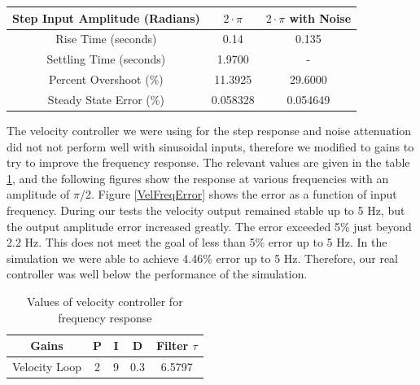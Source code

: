 \documentclass{article}
\theoremstyle{plain}
\theoremstyle{definition}
\theoremstyle{remark}
\begin{document}
\begin{table}[htb]
\begin{center}
    \begin{tabular}{|c|c|c|}
        \hline
        Step Input Amplitude (Radians) & $2 \cdot \pi$ & $2 \cdot \pi$ with Noise \\ \hline
        Rise Time (seconds)            & 0.14          & 0.135                    \\ 
        Settling Time (seconds)        & 1.9700        &  -                    \\ 
        Percent Overshoot (\%)         & 11.3925       & 29.6000                  \\ 
        Steady State Error (\%)        & 0.058328      & 0.054649                 \\
        \hline
    \end{tabular}
\end{center}
\end{table}

The velocity controller we were using for the step response and noise attenuation did not not perform well with sinusoidal inputs, therefore we modified to gains to try to improve the frequency response. The relevant values are given in the table \ref{VelFreqGains}, and the following figures show the response at various frequencies with an amplitude of $\pi$/2. Figure \ref{VelFreqError} shows the error as a function of input frequency. During our tests the velocity output remained stable up to 5 Hz, but the output amplitude error increased greatly. The error exceeded 5\% just beyond 2.2 Hz. This does not meet the goal of less than 5\% error up to 5 Hz. In the simulation we were able to achieve 4.46\% error up to 5 Hz. Therefore, our real controller was well below the performance of the simulation.\\


\begin{table}[htb]
\begin{center}
    \begin{tabular}{|c|c|c|c|c|}
        \hline
        Gains & P   & I & D     & Filter $\tau$   \\ \hline
        Velocity Loop       & 2   & 9    & 0.3   & 6.5797  \\ 
       \hline
    \end{tabular}
\end{center}
\caption{Values of velocity controller for frequency response}
\label{VelFreqGains}
\end{table}
\end{document}
